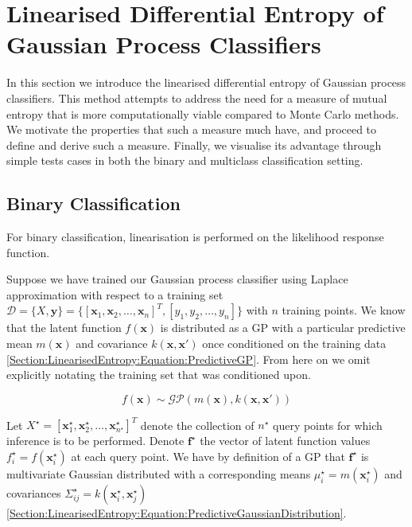 \documentclass{article}
\renewcommand{\vec}[1]{\boldsymbol{#1}}
\begin{document}
\section{Linearised Differential Entropy of Gaussian Process Classifiers}
\label{Section:LinearisedEntropy}

	In this section we introduce the linearised differential entropy of Gaussian process classifiers. This method attempts to address the need for a measure of mutual entropy that is more computationally viable compared to Monte Carlo methods. We motivate the properties that such a measure much have, and proceed to define and derive such a measure. Finally, we visualise its advantage through simple tests cases in both the binary and multiclass classification setting.
	
	\subsection{Binary Classification}

		For binary classification, linearisation is performed on the likelihood response function.
	
		Suppose we have trained our Gaussian process classifier using Laplace approximation with respect to a training set $\mathcal{D} = \{X, \vec{y}\} = \{[ \vec{x}_{1}, \vec{x}_{2}, \dots, \vec{x}_{n}]^{T}, [y_{1}, y_{2}, \dots, y_{n}]\}$ with $n$ training points. We know that the latent function $f(\vec{x})$ is distributed as a GP with a particular predictive mean $m(\vec{x})$ and covariance $k(\vec{x}, \vec{x}')$ once conditioned on the training data \eqref{Section:LinearisedEntropy:Equation:PredictiveGP}. From here on we omit explicitly notating the training set that was conditioned upon.
		
		\begin{equation}
			f(\vec{x}) \sim \mathcal{GP}(m(\vec{x}), k(\vec{x}, \vec{x}'))
		\label{Section:LinearisedEntropy:Equation:PredictiveGP}
		\end{equation}
		
		Let $X^{\star} = [ \vec{x}^{\star}_{1}, \vec{x}^{\star}_{2}, \dots, \vec{x}^{\star}_{n^{\star}}]^{T}$ denote the collection of $n^{\star}$ query points for which inference is to be performed. Denote $\vec{f}^{\star}$ the vector of latent function values $f^{\star}_{i} = f(\vec{x}^{\star}_{i})$ at each query point. We have by definition of a GP that $\vec{f}^{\star}$ is multivariate Gaussian distributed with a corresponding means $\mu^{\star}_{i} = m(\vec{x}^{\star}_{i})$ and covariances $\Sigma^{\star}_{ij} = k(\vec{x}^{\star}_{i}, \vec{x}^{\star}_{j})$ \eqref{Section:LinearisedEntropy:Equation:PredictiveGaussianDistribution}.
		
\end{document}
